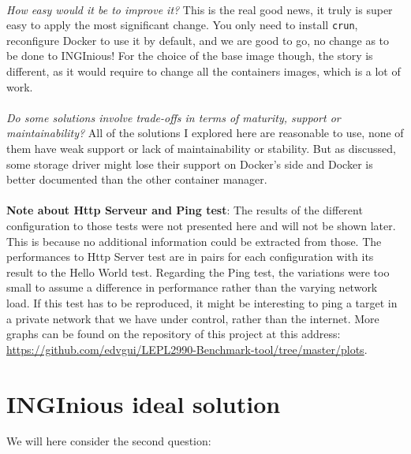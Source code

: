 \paragraph{}\textit{How easy would it be to improve it?}  This is the real good news, it truly is super easy to apply the most significant change.  You only need to install \texttt{crun}, reconfigure Docker to use it by default, and we are good to go, no change as to be done to INGInious!  For the choice of the base image though, the story is different, as it would require to change all the containers images, which is a lot of work.
\paragraph{}\textit{Do some solutions involve trade-offs in terms of maturity, support or maintainability?}  All of the solutions I explored here are reasonable to use, none of them have weak support or lack of maintainability or stability.  But as discussed, some storage driver might lose their support on Docker's side and Docker is better documented than the other container manager.

\paragraph{}\textbf{Note about Http Serveur and Ping test}:  The results of the different configuration to those tests were not presented here and will not be shown later.  This is because no additional information could be extracted from those.  The performances to Http Server test are in pairs for each configuration with its result to the Hello World test.  Regarding the Ping test, the variations were too small to assume a difference in performance rather than the varying network load.  If this test has to be reproduced, it might be interesting to ping a target in a private network that we have under control, rather than the internet. More graphs can be found on the repository of this project at this address: \href{https://github.com/edvgui/LEPL2990-Benchmark-tool/tree/master/plots}{https://github.com/edvgui/LEPL2990-Benchmark-tool/tree/master/plots}.

\section{INGInious ideal solution}
We will here consider the second question:
\begin{center}
\end{center}

